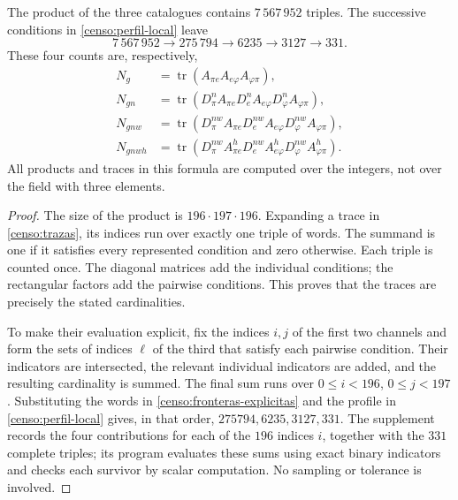 \begin{theorem}
\label{censo:teorema-conteo}
The product of the three catalogues contains \(7\,567\,952\) triples.
The successive conditions in \eqref{censo:perfil-local} leave
\begin{equation}
 7\,567\,952\longrightarrow275\,794\longrightarrow6235
 \longrightarrow3127\longrightarrow331.
 \label{censo:cadena-local}
\end{equation}
These four counts are, respectively,
\begin{align}
 N_g&=\operatorname{tr}(A_{\pi e}A_{e\varphi}A_{\varphi\pi}),
 \nonumber\\
 N_{gn}&=\operatorname{tr}(D_\pi^n A_{\pi e}
             D_e^n A_{e\varphi}D_\varphi^n A_{\varphi\pi}),
 \nonumber\\
 N_{gnw}&=\operatorname{tr}(D_\pi^{nw} A_{\pi e}
             D_e^{nw} A_{e\varphi}D_\varphi^{nw} A_{\varphi\pi}),
 \nonumber\\
 N_{gnwh}&=\operatorname{tr}(D_\pi^{nw} A^h_{\pi e}
             D_e^{nw} A^h_{e\varphi}D_\varphi^{nw} A^h_{\varphi\pi}).
 \label{censo:trazas}
\end{align}
All products and traces in this formula are computed over the integers,
not over the field with three elements.
\end{theorem}
\begin{proof}
The size of the product is \(196\cdot197\cdot196\). Expanding
a trace in \eqref{censo:trazas}, its indices run over exactly one
triple of words. The summand is one if it satisfies every represented
condition and zero otherwise. Each triple is counted once.
The diagonal matrices add the individual conditions; the rectangular
factors add the pairwise conditions. This proves that the traces
are precisely the stated cardinalities.

To make their evaluation explicit, fix the indices \(i,j\) of the first
two channels and form the sets of indices \(\ell\) of the third
that satisfy each pairwise condition. Their indicators are intersected,
the relevant individual indicators are added, and the resulting cardinality is summed.
The final sum runs over \(0\leq i<196\), \(0\leq j<197\).
Substituting the words in \eqref{censo:fronteras-explicitas} and
the profile in \eqref{censo:perfil-local} gives, in that order,
\(275794,6235,3127,331\). The supplement records the four contributions
for each of the \(196\) indices \(i\), together with the \(331\) complete triples;
its program evaluates these sums using exact binary indicators and checks
each survivor by scalar computation. No sampling or tolerance is involved.
\end{proof}

